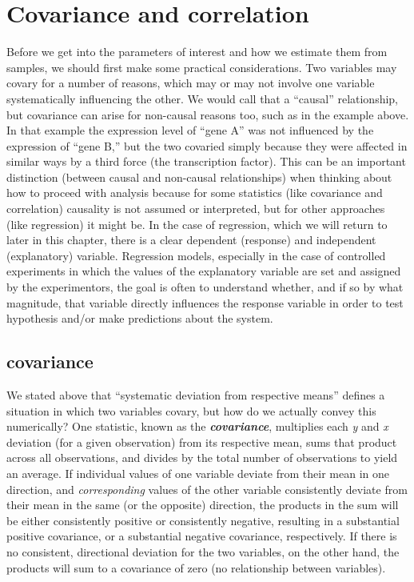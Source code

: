 \documentclass[]{book}
\begin{document}
\hypertarget{covariance-and-correlation}{%
\section{Covariance and correlation}\label{covariance-and-correlation}}

Before we get into the parameters of interest and how we estimate them from samples, we should first make some practical considerations. Two variables may covary for a number of reasons, which may or may not involve one variable systematically influencing the other. We would call that a ``causal'' relationship, but covariance can arise for non-causal reasons too, such as in the example above. In that example the expression level of ``gene A'' was not influenced by the expression of ``gene B,'' but the two covaried simply because they were affected in similar ways by a third force (the transcription factor). This can be an important distinction (between causal and non-causal relationships) when thinking about how to proceed with analysis because for some statistics (like covariance and correlation) causality is not assumed or interpreted, but for other approaches (like regression) it might be. In the case of regression, which we will return to later in this chapter, there is a clear dependent (response) and independent (explanatory) variable. Regression models, especially in the case of controlled experiments in which the values of the explanatory variable are set and assigned by the experimentors, the goal is often to understand whether, and if so by what magnitude, that variable directly influences the response variable in order to test hypothesis and/or make predictions about the system.

\hypertarget{covariance}{%
\subsection{covariance}\label{covariance}}

We stated above that ``systematic deviation from respective means'' defines a situation in which two variables covary, but how do we actually convey this numerically? One statistic, known as the \textbf{\emph{covariance}}, multiplies each \emph{y} and \emph{x} deviation (for a given observation) from its respective mean, sums that product across all observations, and divides by the total number of observations to yield an average. If individual values of one variable deviate from their mean in one direction, and \emph{corresponding} values of the other variable consistently deviate from their mean in the same (or the opposite) direction, the products in the sum will be either consistently positive or consistently negative, resulting in a substantial positive covariance, or a substantial negative covariance, respectively. If there is no consistent, directional deviation for the two variables, on the other hand, the products will sum to a covariance of zero (no relationship between variables).\\
\end{document}
